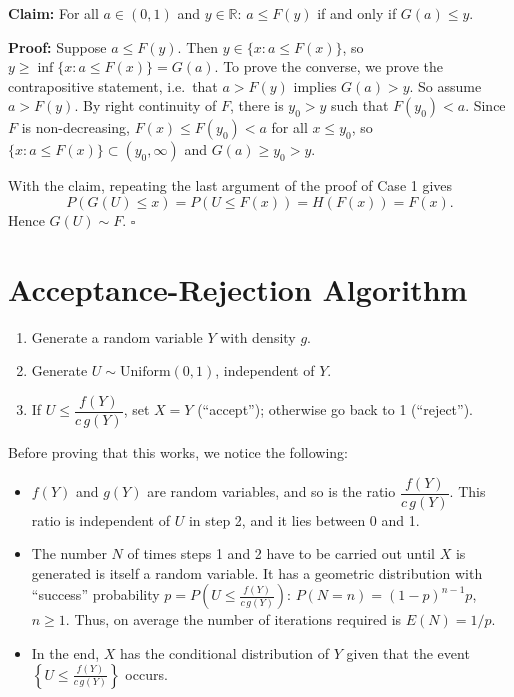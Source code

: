 \documentclass[12pt,a4paper]{article}
\begin{document}
{\textbf{Claim:} For all $a \in (0,1)$ and $y \in \mathbb{R}$: $a \le F(y)$ if and only if $G(a) \le y$.

\textbf{Proof:} Suppose $a \le F(y)$. Then $y \in \{x: a \le F(x)\}$, so $y \ge \inf\{x: a \le F(x)\} = G(a)$. To prove the converse, we prove the contrapositive statement, i.e.\ that $a > F(y)$ implies $G(a) > y$. So assume $a > F(y)$. By right continuity of $F$, there is $y_0 > y$ such that $F(y_0) < a$. Since $F$ is non-decreasing, $F(x) \le F(y_0) < a$ for all $x \le y_0$, so $\{x: a \le F(x)\} \subset (y_0, \infty)$ and $G(a) \ge y_0 > y$.

With the claim, repeating the last argument of the proof of Case 1 gives
\[
P\left(G(U) \le x\right) = P\left(U \le F(x)\right) = H\left(F(x)\right) = F(x).
\]
Hence $G(U) \sim F$. \hfill$\square$

\section{Acceptance-Rejection Algorithm}

\begin{enumerate}
\item Generate a random variable $Y$ with density $g$.
\item Generate $U \sim \text{Uniform}(0,1)$, independent of $Y$.
\item If $U \le \dfrac{f(Y)}{c\,g(Y)}$, set $X = Y$ (``accept''); otherwise go back to 1 (``reject'').
\end{enumerate}

Before proving that this works, we notice the following:
\begin{itemize}
\item $f(Y)$ and $g(Y)$ are random variables, and so is the ratio $\dfrac{f(Y)}{c\,g(Y)}$. This ratio is independent of $U$ in step 2, and it lies between 0 and 1.
\item The number $N$ of times steps 1 and 2 have to be carried out until $X$ is generated is itself a random variable. It has a geometric distribution with ``success'' probability $p = P\left(U \le \frac{f(Y)}{c\,g(Y)}\right)$: $P(N = n) = (1-p)^{n-1}p$, $n \ge 1$. Thus, on average the number of iterations required is $E(N) = 1/p$.
\item In the end, $X$ has the conditional distribution of $Y$ given that the event $\left\{U \le \frac{f(Y)}{c\,g(Y)}\right\}$ occurs.
\end{itemize}

}
\end{document}
